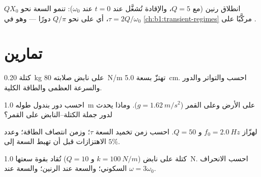 \begin{omfigure}

{\small انطلاق رنين (مع $Q = 5$، والإقادة تُشغَّل عند $t = 0$
عند $\omega_0$): تنمو السعة نحو $QX_0$ 
$\tau = 2Q/\omega_0$، أي على نحو $Q/\pi$ دورًا --- وهو 
في \cref{ch:b1:transient-regimes} مركَّبًا على .}
\end{omfigure}

\section{تمارين}

\begin{exercise}[$\star$]\label{exo:b1:oscillators-resonance:1}
كتلة \qty{0.20}{kg} على نابض صلابته \qty{80}{N/m} تهتزّ
بسعة \qty{5.0}{cm}. احسب  والتواتر والدور
والسرعة العظمى والطاقة الكلية.
\end{exercise}

\begin{exercise}[$\star$]\label{exo:b1:oscillators-resonance:2}
احسب دور بندول طوله \qty{1.0}{m} على الأرض وعلى القمر
($g = \qty{1.62}{m/s^2}$). وماذا يحدث لدور جملة الكتلة--النابض على
القمر؟
\end{exercise}

\begin{exercise}[$\star$]\label{exo:b1:oscillators-resonance:3}
لهزّاز $f_0 = \qty{2.0}{Hz}$ و $Q = 50$. احسب زمن تخميد السعة $\tau$؛
وزمن انتصاف الطاقة؛ وعدد الاهتزازات
قبل أن تهبط السعة إلى $5\%$.
\end{exercise}

\begin{exercise}[$\star$]\label{exo:b1:oscillators-resonance:4}
كتلة على نابض ($k = \qty{100}{N/m}$ و $Q = 10$) تُقاد بقوة
سعتها \qty{1.0}{N}. احسب الانحراف السكوني؛ والسعة عند الرنين؛
والسعة عند $\omega = 3\omega_0$.
\end{exercise}

